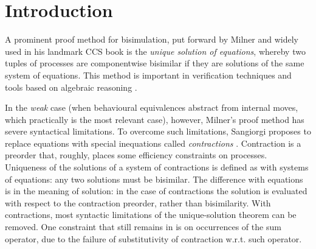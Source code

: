 \section{Introduction}

A prominent proof method for bisimulation, put forward by Milner and widely used in his
landmark CCS book \cite{Mil89} is the
\emph{unique solution of equations}, whereby two tuples of processes are
componentwise bisimilar if they are solutions 
of the same system of equations.
This method  is important in verification techniques and tools
based on algebraic reasoning \cite{theoryAndPractice,RosUnder10,BaeBOOK}. 

In the \emph{weak} case (when  behavioural equivalences abstract from internal moves,
which practically is the most relevant case), however, 
Milner's proof method has severe syntactical limitations. 
To overcome such limitations, Sangiorgi proposes to replace
equations with  special inequations called
\emph{contractions} \cite{sangiorgi2015equations}. Contraction is a
preorder that, roughly, places some efficiency
constraints on processes.  Uniqueness of the solutions of a system of contractions
 is defined as with systems of equations:  
any two solutions must be bisimilar.
The difference with equations is in the meaning of solution:
in the case of contractions
the solution is evaluated with respect to
the contraction preorder, rather than bisimilarity. 
With contractions, most syntactic limitations of the unique-solution theorem can be
removed.  One constraint that still remains in
\cite{sangiorgi2015equations} is on occurrences of the sum operator,
due to the failure of substitutivity of contraction w.r.t. such operator.

